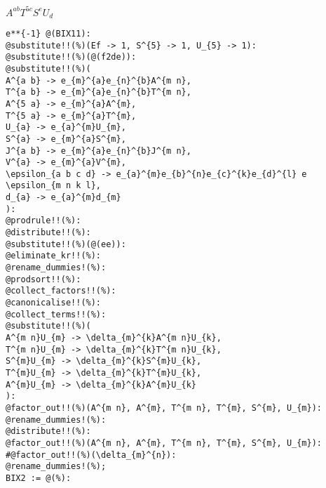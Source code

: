 \documentclass[11pt]{article}
\begin{document}
$A^{a b}T^{5 c}S^{e}U_{d}$
{\color[named]{Blue}\begin{verbatim}
e**{-1} @(BIX11):
@substitute!!(%)(Ef -> 1, S^{5} -> 1, U_{5} -> 1):
@substitute!!(%)(@(f2de)):
@substitute!!(%)(
A^{a b} -> e_{m}^{a}e_{n}^{b}A^{m n},
T^{a b} -> e_{m}^{a}e_{n}^{b}T^{m n},
A^{5 a} -> e_{m}^{a}A^{m},
T^{5 a} -> e_{m}^{a}T^{m},
U_{a} -> e_{a}^{m}U_{m},
S^{a} -> e_{m}^{a}S^{m},
J^{a b} -> e_{m}^{a}e_{n}^{b}J^{m n},
V^{a} -> e_{m}^{a}V^{m},
\epsilon_{a b c d} -> e_{a}^{m}e_{b}^{n}e_{c}^{k}e_{d}^{l} e \epsilon_{m n k l},
d_{a} -> e_{a}^{m}d_{m}
):
@prodrule!!(%):
@distribute!!(%):
@substitute!!(%)(@(ee)):
@eliminate_kr!!(%):
@rename_dummies!(%):
@prodsort!!(%):
@collect_factors!!(%):
@canonicalise!!(%):
@collect_terms!!(%):
@substitute!!(%)(
A^{m n}U_{m} -> \delta_{m}^{k}A^{m n}U_{k},
T^{m n}U_{m} -> \delta_{m}^{k}T^{m n}U_{k},
S^{m}U_{m} -> \delta_{m}^{k}S^{m}U_{k},
T^{m}U_{m} -> \delta_{m}^{k}T^{m}U_{k},
A^{m}U_{m} -> \delta_{m}^{k}A^{m}U_{k}
):
@factor_out!!(%)(A^{m n}, A^{m}, T^{m n}, T^{m}, S^{m}, U_{m}):
@rename_dummies!(%):
@distribute!!(%):
@factor_out!!(%)(A^{m n}, A^{m}, T^{m n}, T^{m}, S^{m}, U_{m}):
#@factor_out!!(%)(\delta_{m}^{n}):
@rename_dummies!(%);
BIX2 := @(%):
\end{verbatim}}
\end{document}
